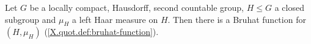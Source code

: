 Let $G$ be a locally compact, Hausdorff, second countable group, $H\le G$ a closed subgroup and $\mu_H$ a left Haar
measure on $H$. Then there is a Bruhat function for $(H,\mu_H)$ (\cref{X.quot.def:bruhat-function}).

